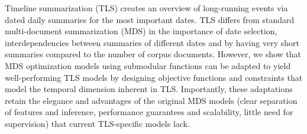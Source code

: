 Timeline summarization (TLS) creates an overview of long-running events via dated daily summaries for the most important dates. TLS differs from standard multi-document summarization (MDS) in the importance of date selection, interdependencies between summaries of different dates and by having very short summaries compared to the number of corpus documents. However, we show that MDS optimization models using submodular functions can be adapted to yield well-performing TLS models by designing objective functions and constraints that model the temporal dimension inherent in TLS. Importantly, these adaptations retain the elegance and advantages of the original MDS models (clear separation of features and inference, performance guarantees and scalability, little need for supervision) that current TLS-specific models lack.
